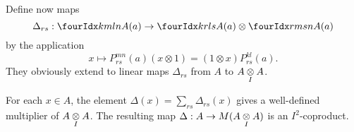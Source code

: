 


Define now maps \[\Delta_{rs}: \Gr{A}{k}{l}{m}{n}(a) \rightarrow \Gr{A}{k}{l}{r}{s}(a)\otimes \Gr{A}{r}{s}{m}{n}(a)\] by the application \[x \mapsto P_{rs}^{mn}(a) (x\otimes 1) = (1\otimes x)P_{rs}^{kl}(a).\] They obviously extend to linear maps $\Delta_{rs}$ from $A$ to $A\underset{I}{\otimes} A$.

\begin{Lem} For each $x\in A$, the element $\Delta(x) = \sum_{rs}\Delta_{rs}(x)$ gives a well-defined multiplier of $A\underset{I}{\otimes} A$. The resulting map $\Delta: A\rightarrow M(A\underset{I}{\otimes} A)$ is an $I^2$-coproduct.
\end{Lem}

